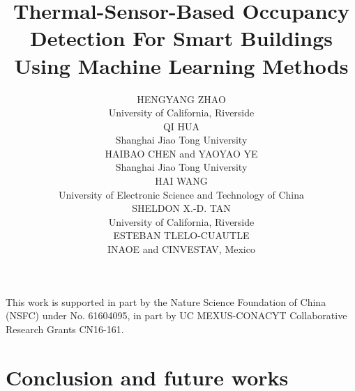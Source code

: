 \documentclass[acmtodaes,notfinal]{acmtrans2m}
\title{Thermal-Sensor-Based Occupancy Detection For Smart Buildings Using Machine Learning Methods}
\author{ \small
HENGYANG ZHAO\\
University of California, Riverside\\
QI HUA \\
Shanghai Jiao Tong University\\
HAIBAO CHEN and YAOYAO YE\\
Shanghai Jiao Tong University\\
HAI WANG \\
University of Electronic Science and Technology of China\\
SHELDON X.-D. TAN \\
University of California, Riverside\\
ESTEBAN TLELO-CUAUTLE \\
INAOE and CINVESTAV, Mexico
}
\let\orgsetcounter\setcounter
\begin{document}
{\let\setcounter\orgsetcounter
\begin{bottomstuff}
\newline \indent
This work is supported in part by the Nature Science Foundation of China
(NSFC) under No. 61604095, in part by UC MEXUS-CONACYT
Collaborative Research Grants CN16-161.  


\end{bottomstuff}
}

\maketitle











%
%
%
%

\section{Conclusion and future works}
\label{sec:conclution}
\end{document}
